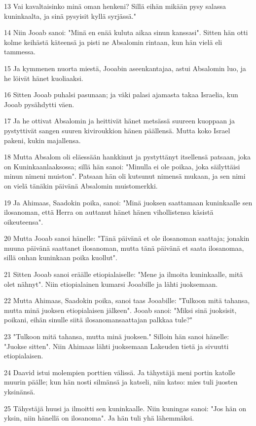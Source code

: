 \par 13 Vai kavaltaisinko minä oman henkeni? Sillä eihän mikään pysy salassa kuninkaalta, ja sinä pysyisit kyllä syrjässä."
\par 14 Niin Jooab sanoi: "Minä en enää kuluta aikaa sinun kanssasi". Sitten hän otti kolme keihästä käteensä ja pisti ne Absalomin rintaan, kun hän vielä eli tammessa.
\par 15 Ja kymmenen nuorta miestä, Jooabin aseenkantajaa, astui Absalomin luo, ja he löivät hänet kuoliaaksi.
\par 16 Sitten Jooab puhalsi pasunaan; ja väki palasi ajamasta takaa Israelia, kun Jooab pysähdytti väen.
\par 17 Ja he ottivat Absalomin ja heittivät hänet metsässä suureen kuoppaan ja pystyttivät sangen suuren kiviroukkion hänen päällensä. Mutta koko Israel pakeni, kukin majallensa.
\par 18 Mutta Absalom oli eläessään hankkinut ja pystyttänyt itsellensä patsaan, joka on Kuninkaanlaaksossa; sillä hän sanoi: "Minulla ei ole poikaa, joka säilyttäisi minun nimeni muiston". Patsaan hän oli kutsunut nimensä mukaan, ja sen nimi on vielä tänäkin päivänä Absalomin muistomerkki.
\par 19 Ja Ahimaas, Saadokin poika, sanoi: "Minä juoksen saattamaan kuninkaalle sen ilosanoman, että Herra on auttanut hänet hänen vihollistensa käsistä oikeuteensa".
\par 20 Mutta Jooab sanoi hänelle: "Tänä päivänä et ole ilosanoman saattaja; jonakin muuna päivänä saattanet ilosanoman, mutta tänä päivänä et saata ilosanomaa, sillä onhan kuninkaan poika kuollut".
\par 21 Sitten Jooab sanoi eräälle etiopialaiselle: "Mene ja ilmoita kuninkaalle, mitä olet nähnyt". Niin etiopialainen kumarsi Jooabille ja lähti juoksemaan.
\par 22 Mutta Ahimaas, Saadokin poika, sanoi taas Jooabille: "Tulkoon mitä tahansa, mutta minä juoksen etiopialaisen jälkeen". Jooab sanoi: "Miksi sinä juoksisit, poikani, eihän sinulle siitä ilosanomansaattajan palkkaa tule?"
\par 23 "Tulkoon mitä tahansa, mutta minä juoksen." Silloin hän sanoi hänelle: "Juokse sitten". Niin Ahimaas lähti juoksemaan Lakeuden tietä ja sivuutti etiopialaisen.
\par 24 Daavid istui molempien porttien välissä. Ja tähystäjä meni portin katolle muurin päälle; kun hän nosti silmänsä ja katseli, niin katso: mies tuli juosten yksinänsä.
\par 25 Tähystäjä huusi ja ilmoitti sen kuninkaalle. Niin kuningas sanoi: "Jos hän on yksin, niin hänellä on ilosanoma". Ja hän tuli yhä lähemmäksi.

